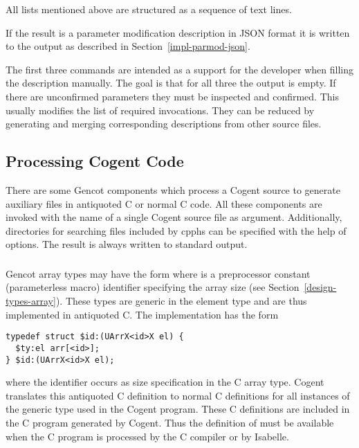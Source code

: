 All lists mentioned above are structured as a sequence of text lines.

If the result is a parameter modification description in JSON format it is written to the output as described in 
Section~\ref{impl-parmod-json}.

The first three commands are intended as a support for the developer when filling the description manually. The goal is that
for all three the output is empty. If there are unconfirmed parameters they must be inspected and confirmed. This usually 
modifies the list of required invocations. They can be reduced by generating and merging corresponding descriptions
from other source files.

\subsection{Processing Cogent Code}
\label{impl-ocomps-cogent}

There are some Gencot components which process a Cogent source to generate auxiliary files in antiquoted C or normal C code.
All these components are invoked with the name of a single Cogent source file as argument. Additionally, directories for
searching files included by cpphs can be specified with the help of  options. The result is always written to 
standard output.

\subsubsection{}

Gencot array types may have the form  where  is a preprocessor constant (parameterless macro) 
identifier specifying the array size (see Section~\ref{design-types-array}). These types are generic in the element type 
and are thus implemented in antiquoted C. The implementation has the form 
\begin{verbatim}
typedef struct $id:(UArrX<id>X el) {
  $ty:el arr[<id>];
} $id:(UArrX<id>X el);
\end{verbatim}
where the identifier  occurs as size specification in the C array type. Cogent translates this antiquoted 
C definition to normal C definitions for all instances of the generic type used in the Cogent program. These C definitions
are included in the C program generated by Cogent.
Thus the definition of  must be available when the C program is processed by the C compiler or by Isabelle.

